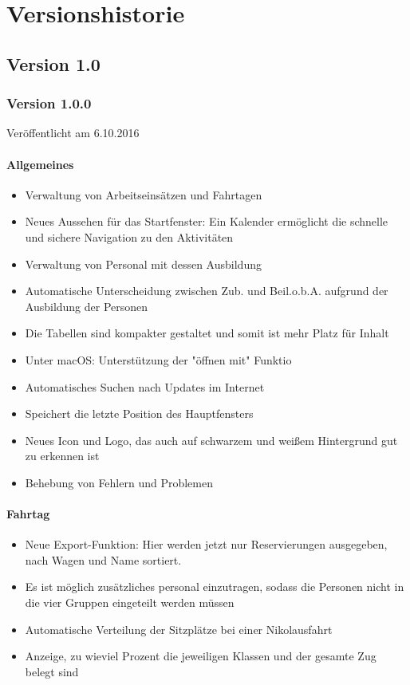 \chapter{Versionshistorie}
\section{Version 1.0}
\subsection{Version 1.0.0}
Veröffentlicht am 6.10.2016
\subsubsection{Allgemeines}
\begin{itemize}
  \item
  Verwaltung von Arbeitseinsätzen und Fahrtagen
  \item
  Neues Aussehen für das Startfenster: Ein Kalender ermöglicht die schnelle und sichere Navigation zu den Aktivitäten
  \item
  Verwaltung von Personal mit dessen Ausbildung
  \item
  Automatische Unterscheidung zwischen Zub. und Beil.o.b.A. aufgrund der Ausbildung der Personen
  \item
  Die Tabellen sind kompakter gestaltet und somit ist mehr Platz für Inhalt
  \item
  Unter macOS: Unterstützung der "öffnen mit" Funktio
  \item
  Automatisches Suchen nach Updates im Internet
  \item
  Speichert die letzte Position des Hauptfensters
  \item
  Neues Icon und Logo, das auch auf schwarzem und weißem Hintergrund gut zu erkennen ist
  \item
  Behebung von Fehlern und Problemen
\end{itemize}

\subsubsection{Fahrtag}
\begin{itemize}
  \item
  Neue Export-Funktion: Hier werden jetzt nur Reservierungen ausgegeben, nach Wagen und Name sortiert.
  \item
  Es ist möglich zusätzliches personal einzutragen, sodass die Personen nicht in die vier Gruppen eingeteilt werden müssen
  \item
  Automatische Verteilung der Sitzplätze bei einer Nikolausfahrt
  \item
  Anzeige, zu wieviel Prozent die jeweiligen Klassen und der gesamte Zug belegt sind
\end{itemize}

